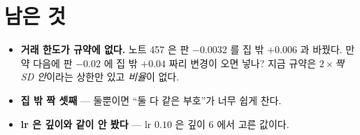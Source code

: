 \documentclass[11pt]{article}
\begin{document}
\section*{남은 것}

\begin{itemize}
\item \textbf{거래 한도가 규약에 없다.} 노트 457 은 판 $-0.0032$ 를
집 밖 $+0.006$ 과 바꿨다. 만약 다음에 판 $-0.02$ 에 집 밖 $+0.04$ 짜리
변경이 오면 넣나? 지금 규약은 \emph{$2\times$짝SD 안}이라는 상한만 있고
\emph{비율}이 없다.
\item \textbf{집 밖 짝 셋째} --- 둘뿐이면 ``둘 다 같은 부호''가 너무
쉽게 찬다.
\item \textbf{lr 은 깊이와 같이 안 봤다} --- lr $0.10$ 은 깊이 $6$ 에서
고른 값이다.
\end{itemize}
\end{document}
